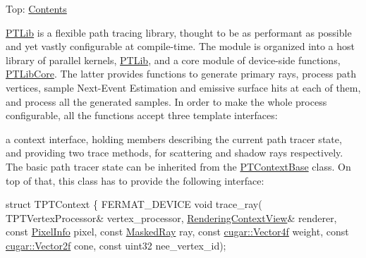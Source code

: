 Top\+: \hyperlink{_overture_contents_page}{Contents}

\hyperlink{group___p_t_lib}{P\+T\+Lib} is a flexible path tracing library, thought to be as performant as possible and yet vastly configurable at compile-\/time. The module is organized into a host library of parallel kernels, \hyperlink{group___p_t_lib}{P\+T\+Lib}, and a core module of device-\/side functions, \hyperlink{group___p_t_lib_core}{P\+T\+Lib\+Core}. The latter provides functions to generate primary rays, process path vertices, sample Next-\/\+Event Estimation and emissive surface hits at each of them, and process all the generated samples. In order to make the whole process configurable, all the functions accept three template interfaces\+: \begin{DoxyParagraph}{}
\label{_p_t_lib_page_TPTContext}%
%

\begin{DoxyEnumerate}
\item a context interface, holding members describing the current path tracer state, and providing two trace methods, for scattering and shadow rays respectively. The basic path tracer state can be inherited from the \hyperlink{struct_p_t_context_base}{P\+T\+Context\+Base} class. On top of that, this class has to provide the following interface\+: ~\newline

\begin{DoxyCode}
\textcolor{keyword}{struct }TPTContext
\{
  FERMAT\_DEVICE
  \textcolor{keywordtype}{void} trace\_ray(
      TPTVertexProcessor&     vertex\_processor, 
      \hyperlink{struct_rendering_context_view}{RenderingContextView}&   renderer,
      \textcolor{keyword}{const} \hyperlink{union_pixel_info}{PixelInfo}         pixel,
      \textcolor{keyword}{const} \hyperlink{struct_masked_ray}{MaskedRay}         ray,
      \textcolor{keyword}{const} \hyperlink{structcugar_1_1_vector}{cugar::Vector4f}   weight,
      \textcolor{keyword}{const} \hyperlink{structcugar_1_1_vector}{cugar::Vector2f}   cone,
      \textcolor{keyword}{const} uint32            nee\_vertex\_id);


\end{DoxyCode}
\end{DoxyEnumerate}
\end{DoxyParagraph}
